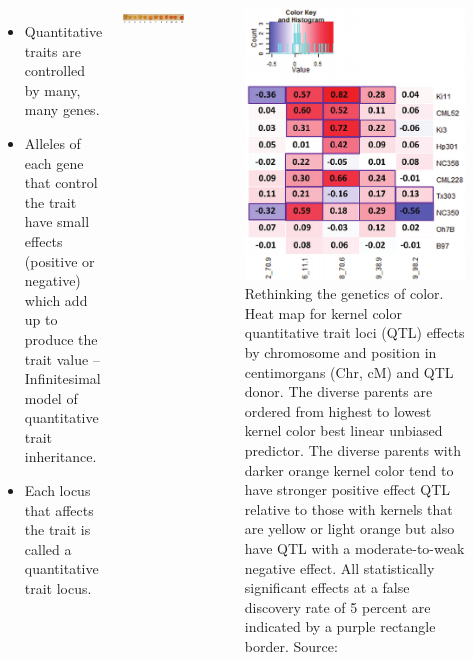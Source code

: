 \documentclass[11pt,ignorenonframetext,aspectratio=169]{beamer}
\begin{document}
\begin{frame}{}
\protect\hypertarget{section-2}{}
\begin{columns}
\begin{itemize}
\item Quantitative traits are controlled by many, many genes.
\item Alleles of each gene that control the trait have small effects (positive or negative) which add up to produce the trait value -- \alert{Infinitesimal model} of quantitative trait inheritance.
\item Each locus that affects the trait is called a quantitative trait locus.
\end{itemize}



\includegraphics[width=0.8\linewidth]{./images/maize_kernel_color_qtl_study} 

\begin{figure}
\includegraphics[width=0.5\linewidth]{./images/heatmap-kernel-color-quantitative-trait-loci-QTL-effects-by-chromosome} \caption{Rethinking the genetics of color. Heat map for kernel color quantitative trait loci (QTL) effects by chromosome and position in centimorgans (Chr, cM) and QTL donor. The diverse parents are ordered from highest to lowest kernel color best linear unbiased predictor. The diverse parents with darker orange kernel color tend to have stronger positive effect QTL relative to those with kernels that are yellow or light orange but also have QTL with a moderate-to-weak negative effect. All statistically significant effects at a false discovery rate of 5 percent are indicated by a purple rectangle border. Source: \cite{chandler2013genetic}}\label{fig:heatmap-kernel-color-corn-qtl-chromosome}
\end{figure}

\end{columns}
\end{frame}
\end{document}
